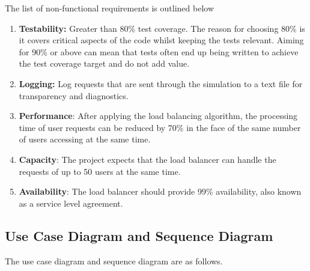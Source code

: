 \documentclass[12pt]{article}
\begin{document}
The list of non-functional requirements is outlined below 
\begin{enumerate}
    \item \textbf{Testability:} Greater than 80\% test coverage. The reason for choosing 80\% is it covers critical aspects of the code whilst keeping the tests relevant. Aiming for 90\% or above can mean that tests often end up being written to achieve the test coverage target and do not add value.
    \item \textbf{Logging:} Log requests that are sent through the simulation to a text file for transparency and diagnostics. 
    
    \item\textbf{Performance}: After applying the load balancing algorithm, the processing time of user requests can be reduced by 70\% in the face of the same number of users accessing at the same time.
    \item\textbf{Capacity}: The project expects that the load balancer can handle the requests of up to 50 users at the same time.
    \item\textbf{Availability}: The load balancer should provide 99\% availability, also known as a service level agreement.
\end{enumerate}
\subsection{Use Case Diagram and Sequence Diagram}
The use case diagram and sequence diagram are as follows. 
\end{document}
